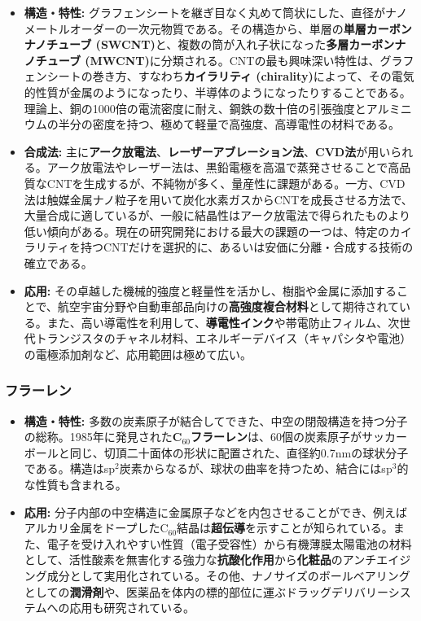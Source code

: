 \documentclass[11pt,a4paper]{ltjsarticle}
\begin{document}
\begin{itemize}
\item \textbf{構造・特性:} グラフェンシートを継ぎ目なく丸めて筒状にした、直径がナノメートルオーダーの一次元物質である。その構造から、単層の\textbf{単層カーボンナノチューブ (SWCNT)}と、複数の筒が入れ子状になった\textbf{多層カーボンナノチューブ (MWCNT)}に分類される。CNTの最も興味深い特性は、グラフェンシートの巻き方、すなわち\textbf{カイラリティ (chirality)}によって、その電気的性質が金属のようになったり、半導体のようになったりすることである。理論上、銅の1000倍の電流密度に耐え、鋼鉄の数十倍の引張強度とアルミニウムの半分の密度を持つ、極めて軽量で高強度、高導電性の材料である。
\item \textbf{合成法:} 主に\textbf{アーク放電法}、\textbf{レーザーアブレーション法}、\textbf{CVD法}が用いられる。アーク放電法やレーザー法は、黒鉛電極を高温で蒸発させることで高品質なCNTを生成するが、不純物が多く、量産性に課題がある。一方、CVD法は触媒金属ナノ粒子を用いて炭化水素ガスからCNTを成長させる方法で、大量合成に適しているが、一般に結晶性はアーク放電法で得られたものより低い傾向がある。現在の研究開発における最大の課題の一つは、特定のカイラリティを持つCNTだけを選択的に、あるいは安価に分離・合成する技術の確立である。
\item \textbf{応用:} その卓越した機械的強度と軽量性を活かし、樹脂や金属に添加することで、航空宇宙分野や自動車部品向けの\textbf{高強度複合材料}として期待されている。また、高い導電性を利用して、\textbf{導電性インク}や帯電防止フィルム、次世代トランジスタのチャネル材料、エネルギーデバイス（キャパシタや電池）の電極添加剤など、応用範囲は極めて広い。
\end{itemize}

\subsubsection*{フラーレン}

\begin{itemize}
\item \textbf{構造・特性:} 多数の炭素原子が結合してできた、中空の閉殻構造を持つ分子の総称。1985年に発見された\textbf{C$_{60}$フラーレン}は、60個の炭素原子がサッカーボールと同じ、切頂二十面体の形状に配置された、直径約0.7nmの球状分子である。構造はsp$^2$炭素からなるが、球状の曲率を持つため、結合にはsp$^3$的な性質も含まれる。
\item \textbf{応用:} 分子内部の中空構造に金属原子などを内包させることができ、例えばアルカリ金属をドープしたC$_{60}$結晶は\textbf{超伝導}を示すことが知られている。また、電子を受け入れやすい性質（電子受容性）から有機薄膜太陽電池の材料として、活性酸素を無害化する強力な\textbf{抗酸化作用}から\textbf{化粧品}のアンチエイジング成分として実用化されている。その他、ナノサイズのボールベアリングとしての\textbf{潤滑剤}や、医薬品を体内の標的部位に運ぶドラッグデリバリーシステムへの応用も研究されている。
\end{itemize}
\end{document}
